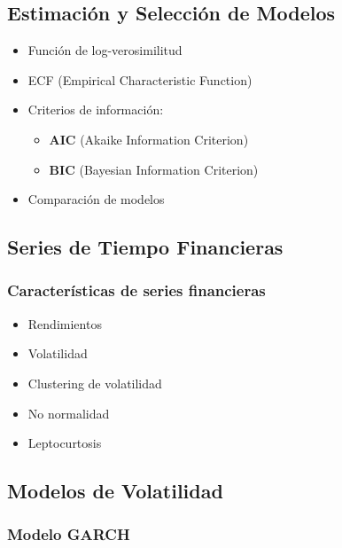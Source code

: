 \documentclass[12pt, a4paper]{article}
\begin{document}
\subsection{Estimación y Selección de Modelos}

\begin{itemize}
  \item Función de log-verosimilitud
  \item ECF (Empirical Characteristic Function)
  \item Criterios de información:
    \begin{itemize}
      \item \textbf{AIC} (Akaike Information Criterion)
      \item \textbf{BIC} (Bayesian Information Criterion)
    \end{itemize}
  \item Comparación de modelos
\end{itemize}

\subsection{Series de Tiempo Financieras}

\subsubsection{Características de series financieras}

\begin{itemize}
  \item Rendimientos
  \item Volatilidad
  \item Clustering de volatilidad
  \item No normalidad
  \item Leptocurtosis
\end{itemize}

\subsection{Modelos de Volatilidad}

\subsubsection{Modelo GARCH}
\end{document}
